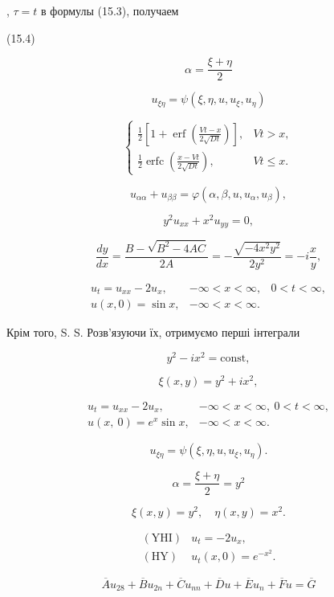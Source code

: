 \documentclass[
  ukrainian,
]{article}
\begin{document}
, \(\tau = t\) в формулы (15.3), получаем

(15.4)

\[
\alpha = \frac{\xi + \eta}{2}
\]

\[
u_{\xi\eta} = \psi(\xi, \eta, u, u_{\xi}, u_{\eta})
\]

\[
\begin{cases} \frac{1}{2} \left[ 1 + \operatorname{erf}\left(\frac{Vt - x}{2\sqrt{Dt}}\right) \right], & Vt > x, \\ \frac{1}{2} \operatorname{erfc}\left(\frac{x - Vt}{2\sqrt{Dt}}\right), & Vt \leq x. \end{cases}
\]

\[
u_{\alpha\alpha} + u_{\beta\beta} = \varphi(\alpha, \beta, u, u_{\alpha}, u_{\beta}),
\]

\[
y^2 u_{xx} + x^2 u_{yy} = 0,
\]

\[
\frac{dy}{dx} = \frac{B - \sqrt{B^2 - 4AC}}{2A} = -\frac{\sqrt{-4x^2y^2}}{2y^2} = -i\frac{x}{y},
\]

\[
\begin{aligned} u_t = u_{xx} - 2u_x, & -\infty < x < \infty, & 0 < t < \infty, \\ u(x, 0) = \sin x, & -\infty < x < \infty. \end{aligned}
\]

Крім того, S. S. Розв'язуючи їх, отримуємо перші інтеграли

\[
y^2 - ix^2 = \text{const},
\]

\[
\xi(x, y) = y^2 + ix^2,
\]

\[
\begin{aligned} u_t = u_{xx} - 2u_x, & -\infty < x < \infty, \ 0 < t < \infty, \\ u(x, \ 0) = e^x \sin x, & -\infty < x < \infty. \end{aligned}
\]

\[
u_{\xi\eta} = \psi(\xi, \eta, u, u_{\xi}, u_{\eta}).
\]

\[
\alpha = \frac{\xi + \eta}{2} = y^2
\]

\[
\xi(x, y) = y^2, \quad \eta(x, y) = x^2.
\]

\[
\begin{aligned} (\text{YHI}) & u_t = -2u_x, \\ (\text{HY}) & u_t(x, 0) = e^{-x^2}. \end{aligned}
\]

\[
\overline{A}u_{28} + \overline{B}u_{2n} + \overline{C}u_{nn} + \overline{D}u + \overline{E}u_{n} + \overline{F}u = \overline{G}
\]
\end{document}
